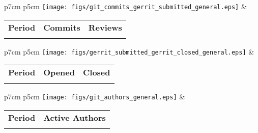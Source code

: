 

\begin{tabular}{p{7cm} p{5cm}}
    \vspace{0pt} 
    \texttt{[image: figs/git\_commits\_gerrit\_submitted\_general.eps]}
    & 
    \vspace{0pt}
    \begin{tabular}{l|r|r|}%
    \bfseries Period & \bfseries Commits & \bfseries Reviews%
    \csvreader[head to column names]{data/git_commits_gerrit_submitted_general.csv}{}%
    {\\ & \commits & \submitted}
    \end{tabular}
\end{tabular}



\begin{tabular}{p{7cm} p{5cm}}
    \vspace{0pt} 
    \texttt{[image: figs/gerrit\_submitted\_gerrit\_closed\_general.eps]}
    & 
    \vspace{0pt}
    \begin{tabular}{l|r|r|}%
    \bfseries Period & \bfseries Opened & \bfseries Closed %
    \csvreader[head to column names]{data/gerrit_submitted_gerrit_closed_general.csv}{}%
    {\\ & \submitted & \closed}
    \end{tabular}
\end{tabular}



\begin{tabular}{p{7cm} p{5cm}}
    \vspace{0pt} 
    \texttt{[image: figs/git\_authors\_general.eps]}
    & 
    \vspace{0pt}
    \begin{tabular}{l|l}%
    \bfseries Period & \bfseries Active Authors %
    \csvreader[head to column names]{data/git_authors_general.csv}{}%
    {\\ & \authors}
    \end{tabular}
\end{tabular}


